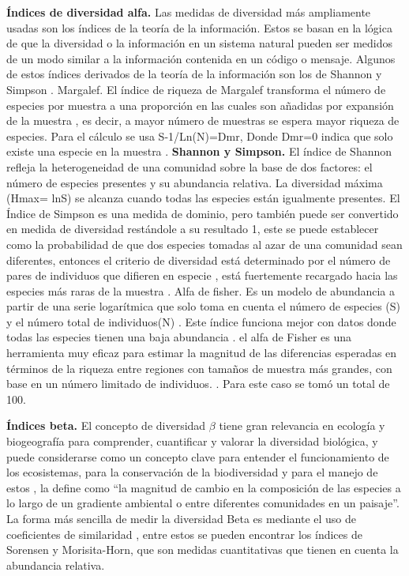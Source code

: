 \documentclass[conference,final,12pt,]{IEEEtran}
\begin{document}
\textbf{Índices de diversidad alfa.} Las medidas de diversidad más
ampliamente usadas son los índices de la teoría de la información. Estos
se basan en la lógica de que la diversidad o la información en un
sistema natural pueden ser medidos de un modo similar a la información
contenida en un código o mensaje. Algunos de estos índices derivados de
la teoría de la información son los de Shannon y Simpson \citep{B}.
Margalef. El índice de riqueza de Margalef transforma el número de
especies por muestra a una proporción en las cuales son añadidas por
expansión de la muestra \citep{N}, es decir, a mayor número de muestras
se espera mayor riqueza de especies. Para el cálculo se usa
S-1/Ln(N)=Dmr, Donde Dmr=0 indica que solo existe una especie en la
muestra \citep{N}. \textbf{Shannon y Simpson.} El índice de Shannon
refleja la heterogeneidad de una comunidad sobre la base de dos
factores: el número de especies presentes y su abundancia relativa. La
diversidad máxima (Hmax= lnS) se alcanza cuando todas las especies están
igualmente presentes. El Índice de Simpson es una medida de dominio,
pero también puede ser convertido en medida de diversidad restándole a
su resultado 1, este se puede establecer como la probabilidad de que dos
especies tomadas al azar de una comunidad sean diferentes, entonces el
criterio de diversidad está determinado por el número de pares de
individuos que difieren en especie \citep{M}, está fuertemente recargado
hacia las especies más raras de la muestra \citep{B}. Alfa de fisher. Es
un modelo de abundancia a partir de una serie logarítmica que solo toma
en cuenta el número de especies (S) y el número total de individuos(N)
\citep{P}. Este índice funciona mejor con datos donde todas las especies
tienen una baja abundancia \citep{Q}. el alfa de Fisher es una
herramienta muy eficaz para estimar la magnitud de las diferencias
esperadas en términos de la riqueza entre regiones con tamaños de
muestra más grandes, con base en un número limitado de individuos.
\citep{R}. Para este caso se tomó un total de 100.

\textbf{Índices beta.} El concepto de diversidad \(\beta\) tiene gran relevancia
en ecología y biogeografía para comprender, cuantificar y valorar la
diversidad biológica, y puede considerarse como un concepto clave para
entender el funcionamiento de los ecosistemas, para la conservación de
la biodiversidad y para el manejo de estos \citep{O}, \citep{AP} la define
como ``la magnitud de cambio en la composición de las especies a lo
largo de un gradiente ambiental o entre diferentes comunidades en un
paisaje''. La forma más sencilla de medir la diversidad Beta es mediante
el uso de coeficientes de similaridad \citep{B}, entre estos se pueden
encontrar los índices de Sorensen y Morisita-Horn, que son medidas
cuantitativas que tienen en cuenta la abundancia relativa.
\end{document}
